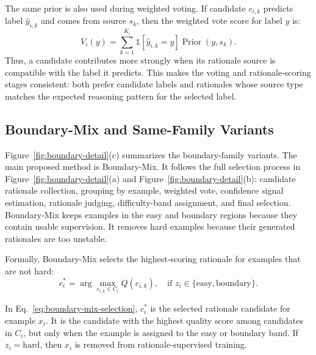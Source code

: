 The same prior is also used during weighted voting. If candidate $c_{i,k}$ predicts label $\hat{y}_{i,k}$ and comes from source $s_k$, then the weighted vote score for label $y$ is:
\begin{equation}
    V_i(y) =
    \sum_{k=1}^{K_i}
    \mathbb{1}[\hat{y}_{i,k}=y]
    \operatorname{Prior}(y, s_k).
    \label{eq:weighted-vote-prior}
\end{equation}
Thus, a candidate contributes more strongly when its rationale source is compatible with the label it predicts. This makes the voting and rationale-scoring stages consistent: both prefer candidate labels and rationales whose source type matches the expected reasoning pattern for the selected label.

\subsection{Boundary-Mix and Same-Family Variants}
\label{sec:boundary-variants}

Figure~\ref{fig:boundary-detail}(c) summarizes the boundary-family variants. The main proposed method is Boundary-Mix. It follows the full selection process in Figure~\ref{fig:boundary-detail}(a) and Figure~\ref{fig:boundary-detail}(b): candidate rationale collection, grouping by example, weighted vote, confidence signal estimation, rationale judging, difficulty-band assignment, and final selection. Boundary-Mix keeps examples in the easy and boundary regions because they contain usable supervision. It removes hard examples because their generated rationales are too unstable.

Formally, Boundary-Mix selects the highest-scoring rationale for examples that are not hard:
\begin{equation}
    c_i^* =
    \arg\max_{c_{i,k} \in C_i} Q(c_{i,k}),
    \quad \text{if } z_i \in \{\text{easy}, \text{boundary}\}.
    \label{eq:boundary-mix-selection}
\end{equation}

In Eq.~\eqref{eq:boundary-mix-selection}, $c_i^*$ is the selected rationale candidate for example $x_i$. It is the candidate with the highest quality score among candidates in $C_i$, but only when the example is assigned to the easy or boundary band. If $z_i = \text{hard}$, then $x_i$ is removed from rationale-supervised training.

